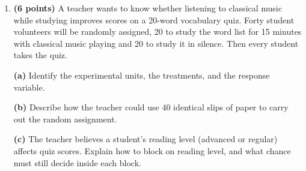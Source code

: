 \documentclass[12pt]{article}
\begin{document}
\begin{enumerate}[leftmargin=1.9em, itemsep=0.16in, resume]
  \boxguard[24]
  \item \textbf{(6 points)} A teacher wants to know whether listening to classical music while
        studying improves scores on a 20-word vocabulary quiz. Forty student volunteers will be
        randomly assigned, 20 to study the word list for 15 minutes with classical music
        playing and 20 to study it in silence. Then every student takes the quiz.

        \vspace{6pt}
        \textbf{(a)} Identify the experimental units, the treatments, and the response
        variable.\\[4pt]

        \boxguard[14]
        \vspace{6pt}
        \textbf{(b)} Describe how the teacher could use 40 identical slips of paper to carry out
        the random assignment.\\[4pt]

        \boxguard[15]
        \vspace{6pt}
        \textbf{(c)} The teacher believes a student's reading level (advanced or regular)
        affects quiz scores. Explain how to block on reading level, and what chance must still
        decide inside each block.\\[4pt]


\end{enumerate}
\end{document}
